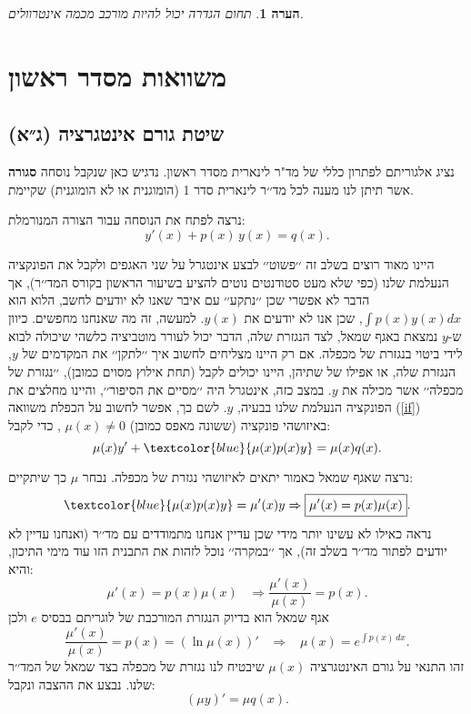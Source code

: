 \documentclass{article}
\numberwithin{equation}{section}
\newtheorem{remark}{הערה}[section]
\begin{document}
\begin{remark}
תחום הגדרה יכול להיות מורכב מכמה אינטרוולים.
\end{remark}


\newpage
\section{משוואות מסדר ראשון}

\subsection{שיטת גורם אינטגרציה (ג״א)}
נציג אלגוריתם לפתרון כללי של  מד"ר לינארית מסדר ראשון. נדגיש כאן שנקבל נוסחה \textbf{סגורה} אשר תיתן לנו מענה לכל מד׳׳ר לינארית סדר 1 (הומוגנית או לא הומוגנית) שקיימת.

נרצה לפתח את הנוסחה עבור הצורה המנורמלת:
\begin{equation}\label{if}
y'(x)+p(x)\,y(x)=q(x).
\end{equation}

היינו מאוד רוצים בשלב זה ׳׳פשוט׳׳ לבצע אינטגרל על שני האגפים ולקבל את הפונקציה הנעלמת שלנו (כפי שלא מעט סטודנטים נוטים להציע בשיעור הראשון בקורס המד׳׳ר), אך הדבר לא אפשרי שכן ׳׳נתקע׳׳ עם איבר שאנו לא יודעים לחשב, הלוא הוא $\int p(x)y(x)dx$, שכן אנו לא יודעים את $y(x)$. למעשה, זה מה שאנחנו מחפשים. כיוון ש-$y$ נמצאת באגף שמאל, לצד הנגזרת שלה, הדבר יכול לעורר מוטביציה כלשהי שיכולה לבוא לידי ביטוי בנגזרת של מכפלה. אם רק היינו מצליחים לחשוב איך ׳׳לתקן׳׳ את המקדמים של $y$, הנגזרת שלה, או אפילו של שתיהן, היינו יכולים לקבל (תחת אילוץ מסוים כמובן), ׳׳נגזרת של מכפלה׳׳ אשר מכילה את $y$. במצב כזה, אינטגרל היה ׳׳מסיים את הסיפור׳׳, והיינו מחלצים את הפונקציה הנעלמת שלנו בבעיה, $y$. לשם כך, אפשר לחשוב על
הכפלת משוואה (\ref{if}) באיזושהי פונקציה (ששונה מאפס כמובן) $\mu(x)\neq 0$ , כדי לקבל:
\begin{equation}
\mu(x)y' + \textcolor{blue}{\mu(x)p(x)y} = \mu(x)q(x).
\end{equation}

נרצה שאגף שמאל כאמור יתאים לאיזושהי נגזרת של מכפלה.
נבחר $\mu$ כך שיתקיים:
\[
\textcolor{blue}{\mu(x)p(x)y}=\mu'(x)y\Rightarrow\boxed{\mu'(x)=p(x)\mu(x)}.
\]
נראה כאילו לא עשינו יותר מידי שכן עדיין אנחנו מתמודדים עם מד׳׳ר (ואנחנו עדיין לא יודעים לפתור מד׳׳ר בשלב זה), אך ׳׳במקרה׳׳ נוכל לזהות את התבנית הזו עוד מימי התיכון, והיא:
\[
\mu'(x)=p(x)\mu(x)\;\;\;\Rightarrow \frac{\mu'(x)}{\mu(x)}=p(x) .
\]
אגף שמאל הוא בדיוק הנגזרת המורכבת של לוגריתם בבסיס $e$ ולכן
\[
\frac{\mu'(x)}{\mu(x)}=p(x)=\left(\ln{\mu(x)}\right)' \;\;\;\Rightarrow\;\;\; \boxed{\mu(x)=e^{\int p(x)\,dx}}.
\]
זהו התנאי על גורם האינטגרציה $\mu(x)$ שיבטיח לנו נגזרת של מכפלה בצד שמאל של המד׳׳ר שלנו.
נבצע את ההצבה ונקבל:
\[
(\mu y)' = \mu q(x).
\]
\end{document}
